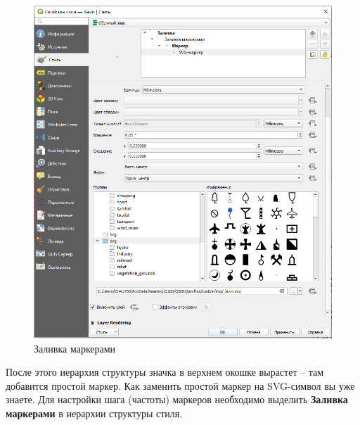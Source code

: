 \documentclass[
  12pt,
]{book}
\begin{document}
\begin{figure}
\centering
\includegraphics{images/symbology/Polygon_filling.png}
\caption{Заливка маркерами}
\end{figure}

После этого иерархия структуры значка в верхнем окошке вырастет -- там добавится простой маркер. Как заменить простой маркер на SVG-символ вы уже знаете. Для настройки шага (частоты) маркеров необходимо выделить \textbf{Заливка маркерами} в иерархии структуры стиля.
\end{document}
